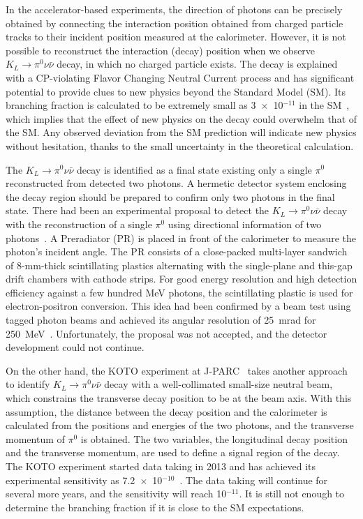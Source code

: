 \documentclass[12pt,times,draftclsnofoot,a4paper]{elsarticle}
\begin{document}
In the accelerator-based experiments, the direction of photons can be precisely obtained by connecting the interaction position obtained from charged particle tracks to their incident position measured at the calorimeter. However, it is not possible to reconstruct the interaction (decay) position when we observe $K_{L} \rightarrow \pi^{0}\nu\bar{\nu}$ decay, in which no charged particle exists. The decay is explained with a CP-violating Flavor Changing Neutral Current process and has significant potential to provide clues to new physics beyond the Standard Model (SM). Its branching fraction is calculated to be extremely small as 3~$\times$~10$^{-11}$ in the SM~\cite{KOTOtheory}, which implies that the effect of new physics on the decay could overwhelm that of the SM. Any observed deviation from the SM prediction will indicate new physics without hesitation, thanks to the small uncertainty in the theoretical calculation.

The $K_{L} \rightarrow \pi^{0}\nu\bar{\nu}$ decay is identified as a final state existing only a single $\pi^{0}$ reconstructed from detected two photons. A hermetic detector system enclosing the decay region should be prepared to confirm only two photons in the final state. There had been an experimental proposal to detect the $K_{L} \rightarrow \pi^{0}\nu\bar{\nu}$ decay with the reconstruction of a single $\pi^{0}$ using directional information of two photons~\cite{KOPIO}. A Preradiator (PR) is placed in front of the calorimeter to measure the photon's incident angle. The PR consists of a close-packed multi-layer sandwich of 8-mm-thick scintillating plastics alternating with the single-plane and this-gap drift chambers with cathode strips. For good energy resolution and high detection efficiency against a few hundred MeV photons, the scintillating plastic is used for electron-positron conversion. This idea had been confirmed by a beam test using tagged photon beams and achieved its angular resolution of 25~mrad for 250~MeV~\cite{KOPIOcdr}. Unfortunately, the proposal was not accepted, and the detector development could not continue.

On the other hand, the KOTO experiment at J-PARC~\cite{KOTOexp} takes another approach to identify $K_{L} \rightarrow \pi^{0}\nu\bar{\nu}$ decay with a well-collimated small-size neutral beam, which constrains the transverse decay position to be at the beam axis. With this assumption, the distance between the decay position and the calorimeter is calculated from the positions and energies of the two photons, and the transverse momentum of $\pi^{0}$ is obtained. The two variables, the longitudinal decay position and the transverse momentum, are used to define a signal region of the decay. The KOTO experiment started data taking in 2013 and has achieved its experimental sensitivity as 7.2~$\times$~10$^{-10}$~\cite{KOTOexp}. The data taking will continue for  several more years, and the sensitivity will reach 10$^{-11}$. It is still not enough to determine the branching fraction if it is close to the SM expectations. 
\end{document}
